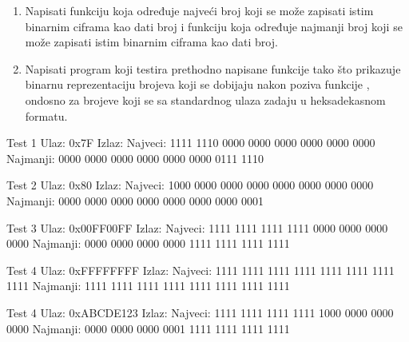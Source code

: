 \begin{Exercise}[label=203]
\begin{enumerate}
\item Napisati funkciju  koja određuje najveći broj koji se može zapisati istim binarnim ciframa kao dati broj i funkciju  koja određuje najmanji broj koji se može zapisati istim binarnim ciframa kao dati broj.
\item Napisati program koji testira prethodno napisane funkcije tako što prikazuje binarnu reprezentaciju brojeva koji se dobijaju nakon poziva funkcije , ondosno  za brojeve koji se sa standardnog ulaza zadaju u heksadekasnom formatu. 
\end{enumerate}

\begin{maxitest}
\begin{test}{Test 1}
Ulaz:   0x7F  
Izlaz:  
 Najveci:
 1111 1110 0000 0000 0000 0000 0000 0000  
 Najmanji:
 0000 0000 0000 0000 0000 0000 0111 1110
\end{test}
\end{maxitest}

\begin{maxitest}
\begin{test}{Test 2}
Ulaz:   0x80
Izlaz:  
 Najveci:
 1000 0000 0000 0000 0000 0000 0000 0000  
 Najmanji:
 0000 0000 0000 0000 0000 0000 0000 0001
\end{test}
\end{maxitest}

\begin{maxitest}
\begin{test}{Test 3}
Ulaz:   0x00FF00FF
Izlaz:  
 Najveci:
 1111 1111 1111 1111 0000 0000 0000 0000  
 Najmanji:
 0000 0000 0000 0000 1111 1111 1111 1111
\end{test}
\end{maxitest}

\begin{maxitest}
\begin{test}{Test 4}
Ulaz:   0xFFFFFFFF
Izlaz:  
 Najveci:
 1111 1111 1111 1111 1111 1111 1111 1111   
 Najmanji:
 1111 1111 1111 1111 1111 1111 1111 1111
\end{test}
\end{maxitest}

\begin{maxitest}
\begin{test}{Test 4}
Ulaz:   0xABCDE123
Izlaz:  
 Najveci:
 1111 1111 1111 1111 1000 0000 0000 0000  
 Najmanji:
 0000 0000 0000 0001 1111 1111 1111 1111
\end{test}
\end{maxitest}

\end{Exercise}
\begin{Answer}[ref=203]
\end{Answer}


